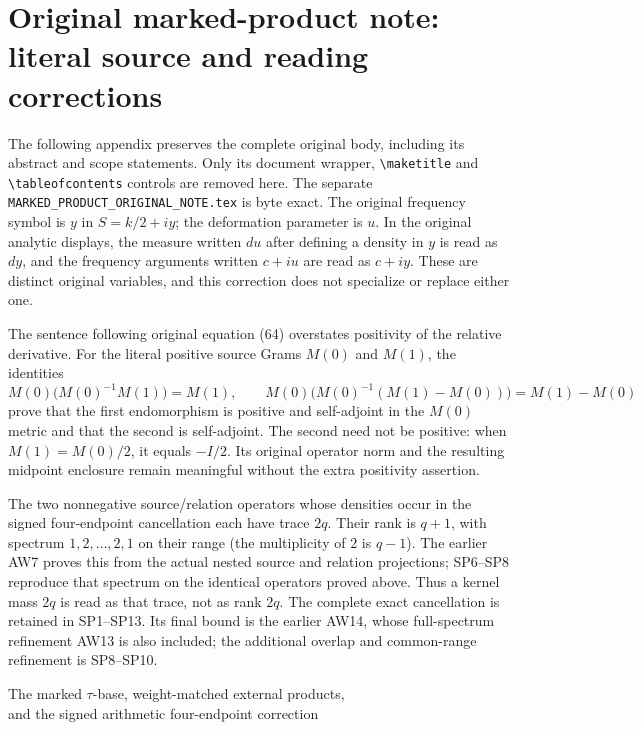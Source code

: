 \documentclass[11pt,a4paper]{article}
\begin{document}
\clearpage
\clearpage
\appendix
\section*{Original marked-product note: literal source and reading corrections}
The following appendix preserves the complete original body, including
its abstract and scope statements. Only its document wrapper,
\verb|\maketitle| and \verb|\tableofcontents| controls are removed here.
The separate \texttt{MARKED\_PRODUCT\_ORIGINAL\_NOTE.tex} is byte exact.
The original frequency symbol is $y$ in $S=k/2+iy$; the deformation
parameter is $u$. In the original analytic displays, the measure
written $du$ after defining a density in $y$ is read as $dy$, and the
frequency arguments written $c+iu$ are read as $c+iy$.
These are distinct original variables, and this correction does not
specialize or replace either one.

The sentence following original equation (64) overstates positivity
of the relative derivative. For the literal positive source Grams
$M(0)$ and $M(1)$, the identities
\[
 M(0)\bigl(M(0)^{-1}M(1)\bigr)=M(1),\qquad
 M(0)\bigl(M(0)^{-1}(M(1)-M(0))\bigr)=M(1)-M(0)
\]
prove that the first endomorphism is positive and self-adjoint in the
$M(0)$ metric and that the second is self-adjoint. The second need
not be positive: when $M(1)=M(0)/2$, it equals $-I/2$.
Its original operator norm and the resulting midpoint enclosure
remain meaningful without the extra positivity assertion.

The two nonnegative source/relation operators whose densities occur
in the signed four-endpoint cancellation each have trace $2q$.
Their rank is $q+1$, with spectrum $1,2,\ldots,2,1$ on their range
(the multiplicity of $2$ is $q-1$). The earlier AW7 proves this from the
actual nested source and relation projections; SP6--SP8 reproduce
that spectrum on the identical operators proved above. Thus a kernel mass
$2q$ is read as that trace, not as rank $2q$. The complete exact
cancellation is retained in SP1--SP13. Its final bound is the earlier
AW14, whose full-spectrum refinement AW13 is also included; the
additional overlap and common-range refinement is SP8--SP10.

\begin{center}\large
The marked $\tau$-base, weight-matched external products,\\
and the signed arithmetic four-endpoint correction
\end{center}
\end{document}
